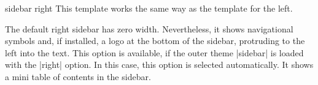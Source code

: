 \begin{element}{sidebar right}\yes\yes\yes
  This template works the same way as the template for the left.

  \begin{templateoptions}
    The default right sidebar has zero width. Nevertheless, it shows navigational symbols and, if installed, a logo at the bottom of the sidebar, protruding to the left into the text.
    This option is available, if the outer theme |sidebar| is loaded with the |right| option. In this case, this option is selected automatically. It shows a mini table of contents in the sidebar. %
  \end{templateoptions}
\end{element}

